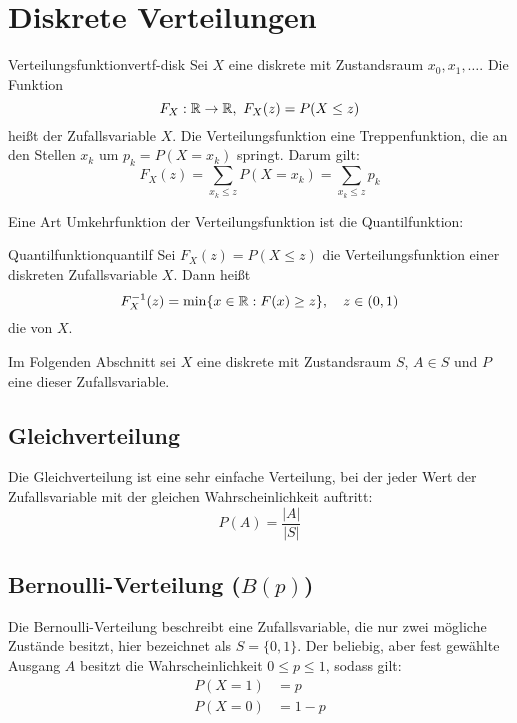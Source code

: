 \section{Diskrete Verteilungen}

\begin{definition}{Verteilungsfunktion}{vertf-disk}
Sei $X$ eine diskrete  mit Zustandsraum $x_0,
x_1, \ldots$. Die Funktion
\[
F_X:\mathbb{R}\to\mathbb{R},\ F_X(z) = P(X \le z)
\]
heißt  der Zufallsvariable $X$. Die
Verteilungsfunktion eine Treppenfunktion, die an den Stellen $x_k$ um
$p_k = P(X=x_k)$ springt. Darum gilt:
\[
F_X(z) = \sum_{x_k\le z}P(X=x_k) = \sum_{x_k\le z} p_k
\]
\end{definition}

Eine Art Umkehrfunktion der Verteilungsfunktion ist die Quantilfunktion:
\begin{definition}{Quantilfunktion}{quantilf}
Sei $F_X(z) = P(X\le z)$ die Verteilungsfunktion einer diskreten Zufallsvariable
$X$. Dann heißt
\[
F_X^{-1}(z) = \mathrm{min}\{x\in\mathbb{R}: F(x) \ge z\},\quad z\in(0,1)
\]
die  von $X$.
\end{definition}

\medskip
Im Folgenden Abschnitt sei $X$ eine diskrete 
mit Zustandsraum $S$, $A \in S$ und $P$ eine
 dieser Zufallsvariable.


\subsection{Gleichverteilung}

Die Gleichverteilung ist eine sehr einfache Verteilung, bei der jeder Wert der
Zufallsvariable mit der gleichen Wahrscheinlichkeit auftritt:
\[
P(A) = \frac{|A|}{|S|}
\]

\subsection{Bernoulli-Verteilung ($B(p)$)}

Die Bernoulli-Verteilung beschreibt eine Zufallsvariable, die nur zwei mögliche
Zustände besitzt, hier bezeichnet als $S = \{0,1\}$. Der beliebig, aber fest
gewählte Ausgang $A$ besitzt die Wahrscheinlichkeit $0 \le p \le 1$, sodass
gilt:
\begin{align*}
P(X=1)&=p  \\
P(X=0)&=1-p
\end{align*}

